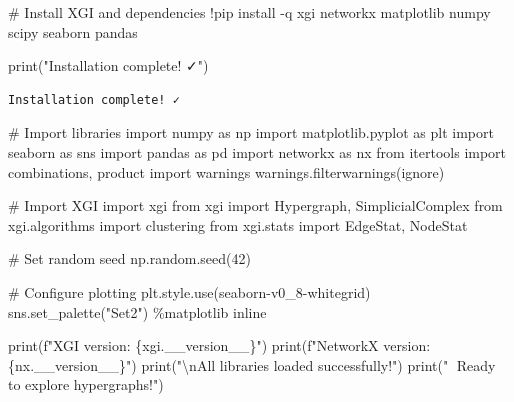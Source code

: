 \documentclass[
  11pt,
  letterpaper,
  oneside,
  openany]{book}
\newenvironment{Shaded}{\begin{snugshade}}{\end{snugshade}}
\newcommand{\BuiltInTok}[1]{\textcolor[rgb]{0.00,0.23,0.31}{#1}}
\newcommand{\CharTok}[1]{\textcolor[rgb]{0.13,0.47,0.30}{#1}}
\newcommand{\CommentTok}[1]{\textcolor[rgb]{0.37,0.37,0.37}{#1}}
\newcommand{\DecValTok}[1]{\textcolor[rgb]{0.68,0.00,0.00}{#1}}
\newcommand{\ImportTok}[1]{\textcolor[rgb]{0.00,0.46,0.62}{#1}}
\newcommand{\NormalTok}[1]{\textcolor[rgb]{0.00,0.23,0.31}{#1}}
\newcommand{\OperatorTok}[1]{\textcolor[rgb]{0.37,0.37,0.37}{#1}}
\newcommand{\SpecialCharTok}[1]{\textcolor[rgb]{0.37,0.37,0.37}{#1}}
\newcommand{\SpecialStringTok}[1]{\textcolor[rgb]{0.13,0.47,0.30}{#1}}
\newcommand{\StringTok}[1]{\textcolor[rgb]{0.13,0.47,0.30}{#1}}
\begin{document}
\begin{Shaded}
\begin{Highlighting}[]
\CommentTok{\# Install XGI and dependencies}
\OperatorTok{!}\NormalTok{pip install }\OperatorTok{{-}}\NormalTok{q xgi networkx matplotlib numpy scipy seaborn pandas}

\BuiltInTok{print}\NormalTok{(}\StringTok{"Installation complete! ✓"}\NormalTok{)}
\end{Highlighting}
\end{Shaded}

\begin{verbatim}
Installation complete! ✓
\end{verbatim}

\begin{Shaded}
\begin{Highlighting}[]
\CommentTok{\# Import libraries}
\ImportTok{import}\NormalTok{ numpy }\ImportTok{as}\NormalTok{ np}
\ImportTok{import}\NormalTok{ matplotlib.pyplot }\ImportTok{as}\NormalTok{ plt}
\ImportTok{import}\NormalTok{ seaborn }\ImportTok{as}\NormalTok{ sns}
\ImportTok{import}\NormalTok{ pandas }\ImportTok{as}\NormalTok{ pd}
\ImportTok{import}\NormalTok{ networkx }\ImportTok{as}\NormalTok{ nx}
\ImportTok{from}\NormalTok{ itertools }\ImportTok{import}\NormalTok{ combinations, product}
\ImportTok{import}\NormalTok{ warnings}
\NormalTok{warnings.filterwarnings(}\StringTok{\textquotesingle{}ignore\textquotesingle{}}\NormalTok{)}

\CommentTok{\# Import XGI}
\ImportTok{import}\NormalTok{ xgi}
\ImportTok{from}\NormalTok{ xgi }\ImportTok{import}\NormalTok{ Hypergraph, SimplicialComplex}
\ImportTok{from}\NormalTok{ xgi.algorithms }\ImportTok{import}\NormalTok{ clustering}
\ImportTok{from}\NormalTok{ xgi.stats }\ImportTok{import}\NormalTok{ EdgeStat, NodeStat}

\CommentTok{\# Set random seed}
\NormalTok{np.random.seed(}\DecValTok{42}\NormalTok{)}

\CommentTok{\# Configure plotting}
\NormalTok{plt.style.use(}\StringTok{\textquotesingle{}seaborn{-}v0\_8{-}whitegrid\textquotesingle{}}\NormalTok{)}
\NormalTok{sns.set\_palette(}\StringTok{"Set2"}\NormalTok{)}
\OperatorTok{\%}\NormalTok{matplotlib inline}

\BuiltInTok{print}\NormalTok{(}\SpecialStringTok{f"XGI version: }\SpecialCharTok{\{}\NormalTok{xgi}\SpecialCharTok{.}\NormalTok{\_\_version\_\_}\SpecialCharTok{\}}\SpecialStringTok{"}\NormalTok{)}
\BuiltInTok{print}\NormalTok{(}\SpecialStringTok{f"NetworkX version: }\SpecialCharTok{\{}\NormalTok{nx}\SpecialCharTok{.}\NormalTok{\_\_version\_\_}\SpecialCharTok{\}}\SpecialStringTok{"}\NormalTok{)}
\BuiltInTok{print}\NormalTok{(}\StringTok{"}\CharTok{\textbackslash{}n}\StringTok{All libraries loaded successfully!"}\NormalTok{)}
\BuiltInTok{print}\NormalTok{(}\StringTok{"🎉 Ready to explore hypergraphs!"}\NormalTok{)}
\end{Highlighting}
\end{Shaded}
\end{document}
